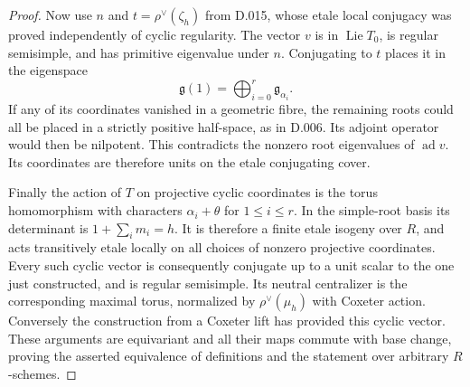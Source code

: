 \begin{proof}
Now use $n$ and $t=\rho^\vee(\zeta_h)$ from D.015,
whose etale local conjugacy was proved independently
of cyclic regularity.  The vector $v$ is in
$\operatorname{Lie}T_0$, is regular semisimple, and
has primitive eigenvalue under $n$.  Conjugating to
$t$ places it in the eigenspace
\[
 \mathfrak g(1)=\bigoplus_{i=0}^r\mathfrak g_{\alpha_i}.
\]
If any of its coordinates vanished in a geometric
fibre, the remaining roots could all be placed in
a strictly positive half-space, as in D.006.
Its adjoint operator would then be nilpotent.
This contradicts the nonzero root eigenvalues of
$\operatorname{ad}v$.  Its coordinates are therefore
units on the etale conjugating cover.

Finally the action of $T$ on projective cyclic
coordinates is the torus homomorphism with characters
$\alpha_i+\theta$ for $1\le i\le r$.  In the
simple-root basis its determinant is
$1+\sum_i m_i=h$.  It is therefore a finite etale
isogeny over $R$, and acts transitively etale locally
on all choices of nonzero projective coordinates.
Every such cyclic vector is consequently conjugate
up to a unit scalar to the one just constructed,
and is regular semisimple.  Its neutral centralizer
is the corresponding maximal torus, normalized
by $\rho^\vee(\mu_h)$ with Coxeter action.
Conversely the construction from a Coxeter lift
has provided this cyclic vector.  These arguments
are equivariant and all their maps commute with
base change, proving the asserted equivalence of
definitions and the statement over arbitrary $R$-schemes.
\end{proof}

